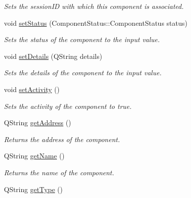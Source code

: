 \begin{DoxyCompactItemize}
\begin{DoxyCompactList}\small\item\em Sets the session\-I\-D with which this component is associated. \end{DoxyCompactList}\item 
\hypertarget{class_component_info_ae94bcd66db14902446f77ec3c90dd6ab}{void \hyperlink{class_component_info_ae94bcd66db14902446f77ec3c90dd6ab}{set\-Status} (Component\-Status\-::\-Component\-Status status)}\label{class_component_info_ae94bcd66db14902446f77ec3c90dd6ab}

\begin{DoxyCompactList}\small\item\em Sets the status of the component to the input value. \end{DoxyCompactList}\item 
\hypertarget{class_component_info_ac0b51efdd669765fb6b7e185e0b33b8c}{void \hyperlink{class_component_info_ac0b51efdd669765fb6b7e185e0b33b8c}{set\-Details} (Q\-String details)}\label{class_component_info_ac0b51efdd669765fb6b7e185e0b33b8c}

\begin{DoxyCompactList}\small\item\em Sets the details of the component to the input value. \end{DoxyCompactList}\item 
void \hyperlink{class_component_info_a4ab89eb4a8d136a1935d82e96596c542}{set\-Activity} ()
\begin{DoxyCompactList}\small\item\em Sets the activity of the component to true. \end{DoxyCompactList}\item 
\hypertarget{class_component_info_a65d9b3f95245479d0c15b5de09b42b51}{Q\-String \hyperlink{class_component_info_a65d9b3f95245479d0c15b5de09b42b51}{get\-Address} ()}\label{class_component_info_a65d9b3f95245479d0c15b5de09b42b51}

\begin{DoxyCompactList}\small\item\em Returns the address of the component. \end{DoxyCompactList}\item 
\hypertarget{class_component_info_af05ed7309b8e0924f81f532aa036f037}{Q\-String \hyperlink{class_component_info_af05ed7309b8e0924f81f532aa036f037}{get\-Name} ()}\label{class_component_info_af05ed7309b8e0924f81f532aa036f037}

\begin{DoxyCompactList}\small\item\em Returns the name of the component. \end{DoxyCompactList}\item 
\hypertarget{class_component_info_ae884b3d520b018bddae00d9feea0c888}{Q\-String \hyperlink{class_component_info_ae884b3d520b018bddae00d9feea0c888}{get\-Type} ()}\label{class_component_info_ae884b3d520b018bddae00d9feea0c888}


\end{DoxyCompactItemize}
